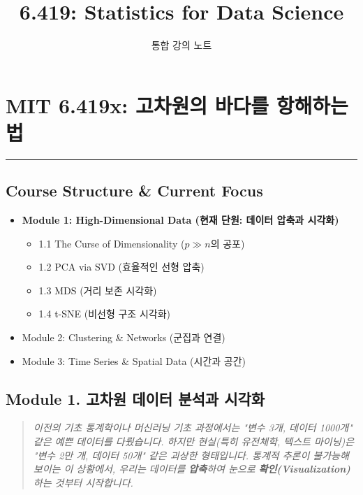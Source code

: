 \documentclass[11pt,a4paper]{book}
\title{\textbf{6.419: Statistics for Data Science}}
\author{통합 강의 노트}
\date{}
\theoremstyle{definition}
\begin{document}
\maketitle
\tableofcontents


\chapter{MIT 6.419x: 고차원의 바다를 항해하는 법}
\label{ch:lecture1}


\vspace{1cm}
\hrule
\vspace{1cm}

\section*{Course Structure \& Current Focus}
\begin{itemize}
    \item \textbf{\textcolor{mainblue}{Module 1: High-Dimensional Data (현재 단원: 데이터 압축과 시각화)}}
    \begin{itemize}
        \item 1.1 The Curse of Dimensionality ($p \gg n$의 공포)
        \item 1.2 PCA via SVD (효율적인 선형 압축)
        \item 1.3 MDS (거리 보존 시각화)
        \item 1.4 t-SNE (비선형 구조 시각화)
    \end{itemize}
    \item Module 2: Clustering \& Networks (군집과 연결)
    \item Module 3: Time Series \& Spatial Data (시간과 공간)
\end{itemize}


\section{Module 1. 고차원 데이터 분석과 시각화}

\begin{quote}
\textit{이전의 기초 통계학이나 머신러닝 기초 과정에서는 "변수 3개, 데이터 1000개" 같은 예쁜 데이터를 다뤘습니다. 하지만 현실(특히 유전체학, 텍스트 마이닝)은 "변수 2만 개, 데이터 50개" 같은 괴상한 형태입니다. 통계적 추론이 불가능해 보이는 이 상황에서, 우리는 데이터를 \textbf{압축}하여 눈으로 \textbf{확인(Visualization)}하는 것부터 시작합니다.}
\end{quote}
\end{document}
